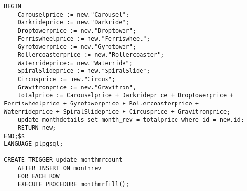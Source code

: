 \begin{lstlisting}
BEGIN
    Carouselprice := new."Carousel";
    Darkrideprice := new."Darkride";
    Droptowerprice := new."Droptower";
    Ferriswheelprice := new."Ferriswheel";
    Gyrotowerprice := new."Gyrotower";
    Rollercoasterprice := new."Rollercoaster";
    Waterrideprice:= new."Waterride";
    SpiralSlideprice := new."SpiralSlide";
    Circusprice := new."Circus";
    Gravitronprice := new."Gravitron";
    totalprice := Carouselprice + Darkrideprice + Droptowerprice + Ferriswheelprice + Gyrotowerprice + Rollercoasterprice + Waterrideprice + SpiralSlideprice + Circusprice + Gravitronprice;
    update monthdetails set month_rev = totalprice where id = new.id;
    RETURN new;
END;$$
LANGUAGE plpgsql;

CREATE TRIGGER update_monthmrcount
    AFTER INSERT ON monthrev
    FOR EACH ROW
    EXECUTE PROCEDURE monthmrfill();
\end{lstlisting}
